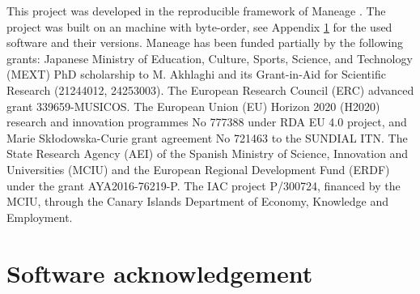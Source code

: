 \documentclass[10pt, twocolumn]{article}
\begin{document}
This project was developed in the reproducible framework of Maneage \citep[\emph{Man}aging data lin\emph{eage},][latest Maneage commit \maneageversion{}, from \maneagedate]{maneage}.
The project was built on an {\machinearchitecture} machine with {\machinebyteorder} byte-order, see Appendix \ref{appendix:software} for the used software and their versions.
Maneage has been funded partially by the following grants: Japanese Ministry of Education, Culture, Sports, Science, and Technology (MEXT) PhD scholarship to M. Akhlaghi and its Grant-in-Aid for Scientific Research (21244012, 24253003).
The European Research Council (ERC) advanced grant 339659-MUSICOS.
The European Union (EU) Horizon 2020 (H2020) research and innovation programmes No 777388 under RDA EU 4.0 project, and Marie Sk\l{}odowska-Curie grant agreement No 721463 to the SUNDIAL ITN.
The State Research Agency (AEI) of the Spanish Ministry of Science, Innovation and Universities (MCIU) and the European Regional Development Fund (ERDF) under the grant AYA2016-76219-P.
The IAC project P/300724, financed by the MCIU, through the Canary Islands Department of Economy, Knowledge and Employment.

\printbibliography

\appendix

\section{Software acknowledgement}
\label{appendix:software}


\end{document}
